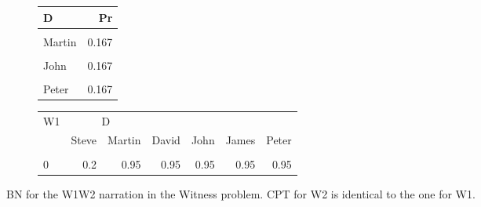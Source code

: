 \documentclass[10pt,]{scrartcl}
\begin{document}
\begin{figure}
 \hfill
\begin{subfigure}[!ht]{0.3\textwidth}
\begin{table}[H]
\centering
\begin{tabular}{lr}
\toprule
D & Pr\\
\midrule
\cellcolor{gray!6}{Steve} & \cellcolor{gray!6}{0.167}\\
Martin & 0.167\\
\cellcolor{gray!6}{David} & \cellcolor{gray!6}{0.167}\\
John & 0.167\\
\cellcolor{gray!6}{James} & \cellcolor{gray!6}{0.167}\\
Peter & 0.167\\
\bottomrule
\end{tabular}
\end{table}
\end{subfigure}
\centering
\begin{subfigure}[!ht]{0.3\textwidth}
\begin{table}[H]
\centering\begin{table}[H]
\centering
\begin{tabular}{lrrrrrr}
\toprule
\multicolumn{1}{c}{W1} & \multicolumn{2}{c}{D} \\
  & Steve & Martin & David & John & James & Peter\\
\midrule
\cellcolor{gray!6}{\cellcolor{gray!6}{1}} & \cellcolor{gray!6}{\cellcolor{gray!6}{0.8}} & \cellcolor{gray!6}{\cellcolor{gray!6}{0.05}} & \cellcolor{gray!6}{\cellcolor{gray!6}{0.05}} & \cellcolor{gray!6}{\cellcolor{gray!6}{0.05}} & \cellcolor{gray!6}{\cellcolor{gray!6}{0.05}} & \cellcolor{gray!6}{\cellcolor{gray!6}{0.05}}\\
0 & 0.2 & 0.95 & 0.95 & 0.95 & 0.95 & 0.95\\
\bottomrule
\end{tabular}
\end{table}
\end{table}
\end{subfigure}
\caption{BN for the \textsf{W1W2} narration in the \textsf{Witness} problem. CPT for \textsf{W2} is identical to the one for \textsf{W1}.}
\label{fig:w1w2}
\end{figure}
\end{document}
